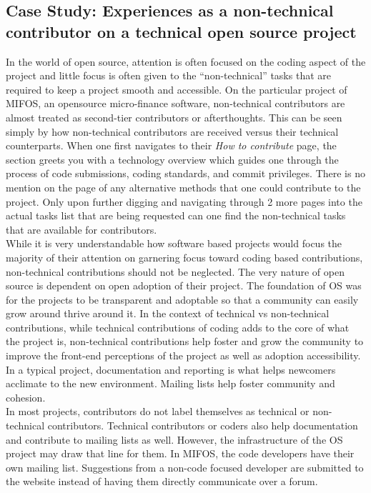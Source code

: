 \subsection{Case Study: Experiences as a non-technical contributor on a technical open source project}
 
In the world of open source, attention is often focused on the coding aspect of the project and little focus is often given to the “non-technical” tasks that are required to keep a project smooth and accessible. On the particular project of MIFOS, an opensource micro-finance software, non-technical contributors are almost treated as second-tier contributors or afterthoughts. This can be seen simply by how non-technical contributors are received versus their technical counterparts. When one first navigates to their {\it How to contribute} page, the section greets you with a technology overview which guides one through the process of code submissions, coding standards, and commit privileges. There is no mention on the page of any alternative methods that one could contribute to the project. Only upon further digging and navigating through 2 more pages into the actual tasks list that are being requested can one find the non-technical tasks that are available for contributors.\\

\noindent While it is very understandable how software based projects would focus the majority of their attention on garnering focus toward coding based contributions, non-technical contributions should not be neglected. The very nature of open source is dependent on open adoption of their project. The foundation of OS was for the projects to be transparent and adoptable so that a community can easily grow around thrive around it. In the context of technical vs non-technical contributions, while technical contributions of coding adds to the core of what the project is, non-technical contributions help foster and grow the community to improve the front-end perceptions of the project as well as adoption accessibility. In a typical project, documentation and reporting is what helps newcomers acclimate to the new environment. Mailing lists help foster community and cohesion.\\

\noindent In most projects, contributors do not label themselves as technical or non-technical contributors. Technical contributors or coders also help documentation and contribute to mailing lists as well.  However, the infrastructure of the OS project may draw that line for them. In MIFOS, the code developers have their own mailing list. Suggestions from a non-code focused developer are submitted to the website instead of having them directly communicate over a forum. \\

